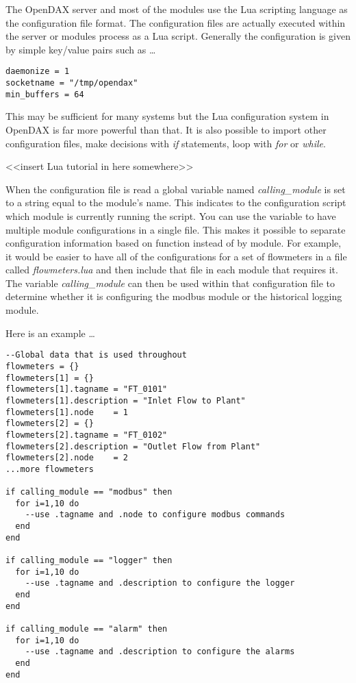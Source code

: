 The OpenDAX server and most of the modules use the Lua scripting language as the configuration file format.  The configuration files are actually executed within the server or modules process as a Lua script.  Generally the configuration is given by simple key/value pairs such as \ldots

\begin{verbatim}
daemonize = 1
socketname = "/tmp/opendax"
min_buffers = 64
\end{verbatim}

This may be sufficient for many systems but the Lua configuration system in OpenDAX is far more powerful than that.  It is also possible to import other configuration files, make decisions with \emph{if} statements, loop with \emph{for} or \emph{while}.

<<insert Lua tutorial in here somewhere>>

When the configuration file is read a global variable named \emph{calling\_module} is set to a string equal to the module's name.  This indicates to the configuration script which module is currently running the script.  You can use the variable to have multiple module configurations in a single file.  This makes it possible to separate configuration information based on function instead of by module.  For example, it would be easier to have all of the configurations for a set of flowmeters in a file called \emph{flowmeters.lua} and then include that file in each module that requires it.  The variable \emph{calling\_module} can then be used within that configuration file to determine whether it is configuring the modbus module or the historical logging module.

Here is an example \ldots

\begin{verbatim}
--Global data that is used throughout
flowmeters = {}
flowmeters[1] = {}
flowmeters[1].tagname = "FT_0101"
flowmeters[1].description = "Inlet Flow to Plant"
flowmeters[1].node    = 1
flowmeters[2] = {}
flowmeters[2].tagname = "FT_0102"
flowmeters[2].description = "Outlet Flow from Plant"
flowmeters[2].node    = 2
...more flowmeters

if calling_module == "modbus" then
  for i=1,10 do
    --use .tagname and .node to configure modbus commands
  end
end

if calling_module == "logger" then
  for i=1,10 do
    --use .tagname and .description to configure the logger
  end
end

if calling_module == "alarm" then
  for i=1,10 do
    --use .tagname and .description to configure the alarms
  end
end
\end{verbatim}

